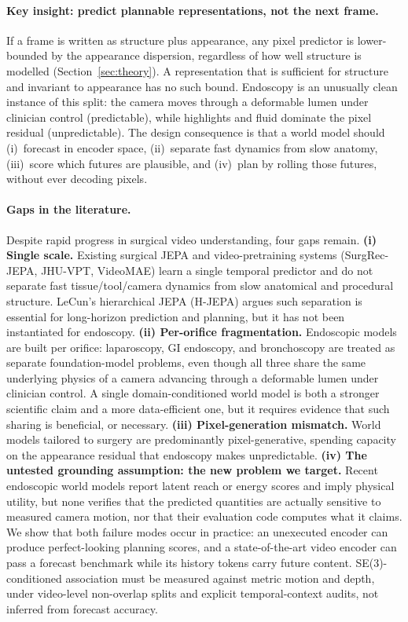 \documentclass[preprint,12pt]{elsarticle}
\begin{document}
\paragraph{Key insight: predict plannable representations, not the next frame.}
If a frame is written as structure plus appearance, any pixel predictor is lower-bounded by the appearance dispersion, regardless of how well structure is modelled (Section~\ref{sec:theory}).
A representation that is sufficient for structure and invariant to appearance has no such bound.
Endoscopy is an unusually clean instance of this split: the camera moves through a deformable lumen under clinician control (predictable), while highlights and fluid dominate the pixel residual (unpredictable).
The design consequence is that a world model should (i)~forecast in encoder space, (ii)~separate fast dynamics from slow anatomy, (iii)~score which futures are plausible, and (iv)~plan by rolling those futures, without ever decoding pixels.

\paragraph{Gaps in the literature.}
Despite rapid progress in surgical video understanding, four gaps remain.
\textbf{(i) Single scale.}
Existing surgical JEPA and video-pretraining systems (SurgRec-JEPA, JHU-VPT, VideoMAE) learn a single temporal predictor and do not separate fast tissue/tool/camera dynamics from slow anatomical and procedural structure.
LeCun's hierarchical JEPA (H-JEPA) argues such separation is essential for long-horizon prediction and planning, but it has not been instantiated for endoscopy.
\textbf{(ii) Per-orifice fragmentation.}
Endoscopic models are built per orifice: laparoscopy, GI endoscopy, and bronchoscopy are treated as separate foundation-model problems, even though all three share the same underlying physics of a camera advancing through a deformable lumen under clinician control.
A single domain-conditioned world model is both a stronger scientific claim and a more data-efficient one, but it requires evidence that such sharing is beneficial, or necessary.
\textbf{(iii) Pixel-generation mismatch.}
World models tailored to surgery are predominantly pixel-generative, spending
capacity on the appearance residual that endoscopy makes unpredictable.
\textbf{(iv) The untested grounding assumption: the new problem we target.}
Recent endoscopic world models report latent reach or energy scores and imply
physical utility, but none verifies that the predicted quantities are actually
sensitive to measured camera motion, nor that their evaluation code computes
what it claims. We show that both failure modes occur in practice: an
unexecuted encoder can produce perfect-looking planning scores, and a
state-of-the-art video encoder can pass a forecast benchmark while its history
tokens carry future content. SE(3)-conditioned association must be measured
against metric motion and depth, under video-level non-overlap splits and
explicit temporal-context audits, not inferred from forecast accuracy.
\end{document}
